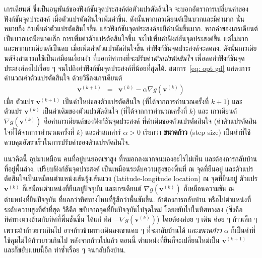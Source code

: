 เกรเดียนต์ 
ซึ่งเป็นอนุพันธ์ของฟังก์ชันจุดประสงค์ต่อตัวแปรตัดสินใจ
จะบอกอัตราการเปลี่ยนค่าของฟังก์ชันจุดประสงค์
เมื่อตัวแปรตัดสินใจเพิ่มค่าขึ้น.
ดังนั้นหาก{เกรเดียนต์}เป็นบวกและมีค่ามาก
นั่นหมายถึง 
ถ้าเพิ่มค่าตัวแปรตัดสินใจขึ้น
แล้วฟังก์ชันจุดประสงค์จะมีค่าเพิ่มขึ้นมาก.
หากค่าของ{เกรเดียนต์}เป็นบวกแต่มีขนาดเล็ก
การเพิ่มค่าตัวแปรตัดสินใจขึ้น
จะไปเพิ่มค่าฟังก์ชันจุดประสงค์ขึ้น แต่ไม่มาก
และหากเกรเดียนต์เป็นลบ
เมื่อเพิ่มค่าตัวแปรตัดสินใจขึ้น
ค่าฟังก์ชันจุดประสงค์จะลดลง.
ดังนั้นเกรเดียนต์จึงสามารถใช้เป็นเสมือนเงื่อนงำ 
ที่บอกทิศทางที่จะปรับค่า\textit{ตัวแปรตัดสินใจ} เพื่อลดค่าฟังก์ชันจุดประสงค์ลงไปเรื่อย ๆ
จนไปถึงค่าฟังก์ชันจุดประสงค์ที่น้อยที่สุดได้.
สมการ~\ref{eq: opt gd} 
แสดงการคำนวณค่าตัวแปรตัดสินใจ
ด้วยวิธีลงเกรเดียนต์
\begin{eqnarray}
\bm{v}^{(k+1)}
&=&
\bm{v}^{(k)} - \alpha \nabla g(\bm{v}^{(k)})
\label{eq: opt gd}
\end{eqnarray}
เมื่อ 
ตัวแปร $\bm{v}^{(k+1)}$
เป็นค่าใหม่ของตัวแปรตัดสินใจ (ที่ได้จากการคำนวณครั้งที่ $k+1$)
และ
ตัวแปร $\bm{v}^{(k)}$
เป็นค่าเดิมของตัวแปรตัดสินใจ (ที่ได้จากการคำนวณครั้งที่ $k$)
และ
เกรเดียนต์
$\nabla g(\bm{v}^{(k)})$
คือค่าเกรเดียนต์ของฟังก์ชันจุดประสงค์
ที่ค่าเดิมของตัวแปรตัดสินใจ 
(ค่าตัวแปรตัดสินใจที่ได้จากการคำนวณครั้งที่ $k$)
และค่าสเกล่าร์ $\alpha > 0$ เรียกว่า \textbf{ขนาดก้าว} (step size)
เป็นค่าที่ใช้ควบคุมอัตราเร็วในการปรับค่าของตัวแปรตัดสินใจ.

แนวคิดนี้ อุปมาเหมือน คนที่อยู่บนยอดเขาสูง 
ที่หมอกลงมากจนมองอะไรไม่เห็น 
และต้องการกลับบ้านที่อยู่พื้นล่าง.
เปรียบฟังก์ชันจุดประสงค์
เป็นเหมือนระดับความสูงของพื้นที่ ณ จุดที่ยืนอยู่
และตัวแปรตัดสินใจเป็นเหมือนตำแหน่งเส้นรุ้งเส้นแวง (latitude-longitude location) ณ จุดที่ยืนอยู่
ตัวแปร $\bm{v}^{(k)}$ ก็เสมือนตำแหน่งที่ยืนอยู่ปัจจุบัน
และเกรเดียนต์ $\nabla g(\bm{v}^{(k)})$ ก็เหมือนความชัน
ณ ตำแหน่งที่ยืนปัจจุบัน
ที่บอกว่าทิศทางไหนที่รู้สึกว่าพื้นชันขึ้น.
ถ้าต้องการกลับบ้าน หรือไปตำแหน่งที่ระดับความสูงที่ต่ำที่สุด
วิธีคือ ขยับจากจุดที่ยืนปัจจุบันไปจุดใหม่
โดยขยับไปในทิศทางลง (ซึ่งคือ ทิศทางตรงข้ามกับทิศที่พื้นชันขึ้น ได้แก่ ทิศ $-\nabla g(\bm{v}^{(k)})$)
โดยต้องค่อย ๆ เดิน ค่อย ๆ ก้าวเล็ก ๆ เพราะถ้าก้าวยาวเกินไป อาจก้าวข้ามทางเดินลงเขาแคบ ๆ ที่จะกลับบ้านได้ และ\textit{ขนาดก้าว} $\alpha$ ก็เป็นค่าที่ใช้คุมไม่ให้ก้าวยาวเกินไป
หลังจากก้าวไปแล้ว
ตอนนี้ ตำแหน่งที่ยืนก็จะเปลี่ยนใหม่เป็น $\bm{v}^{(k+1)}$
และก็ขยับแบบนี้อีก ทำซ้ำเรื่อย ๆ จนกลับถึงบ้าน.

